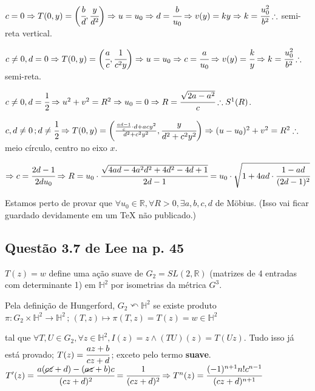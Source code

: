 \documentclass[10pt,a4paper]{article}
\begin{document}
		$c = 0 \Rightarrow T(0,y) = \bigg( \cfrac{b}{d}, \cfrac{y}{d^2} \bigg) \Rightarrow u = u_0 \Rightarrow d = \cfrac{b}{u_0} \Rightarrow v(y) = ky \Rightarrow k = \cfrac{u_0^2}{b^2} \therefore$ semi-reta vertical.

		$c \ne 0, d = 0 \Rightarrow T(0,y) = \bigg( \cfrac{a}{c}, \cfrac{1}{c^2 y} \bigg) \Rightarrow u = u_0 \Rightarrow c = \cfrac{a}{u_0} \Rightarrow v(y) = \cfrac{k}{y} \Rightarrow k = \cfrac{u_0^2}{b^2} \therefore$ semi-reta.

		$c \ne 0, d = \cfrac{1}{2} \Rightarrow u^2 + v^2 = R^2 \Rightarrow u_0 = 0 \Rightarrow R = \cfrac{\sqrt{2a - a^2}}{c} \therefore S^1(R)$.

		$c, d \ne 0\,; d \ne \cfrac{1}{2} \Rightarrow T(0,y) = \bigg( \frac{\frac{ad - 1}{c} \cdot d + acy^2}{d^2 + c^2 y^2}, \cfrac{y}{d^2 + c^2 y^2} \bigg) \Rightarrow (u - u_0)^2 + v^2 = R^2 \therefore$ meio c\'irculo, centro no eixo $x$.

		$\Rightarrow c = \cfrac{2d - 1}{2d u_0} \Rightarrow R = u_0 \cdot \cfrac{\sqrt{4ad - 4a^2 d^2 + 4d^2 - 4d + 1}}{2d - 1} = u_0 \cdot \sqrt{1 + 4ad \cdot \cfrac{1 - ad}{(2d - 1)^2}} $

		\vspace{3mm}

		Estamos perto de provar que $\forall u_0 \in \mathbb{R}, \forall R > 0, \exists a,b,c,d $ de M\"obius. (Isso vai ficar guardado devidamente em um TeX n\~ao publicado.)

		\subsection{Quest\~ao 3.7 de Lee na p. 45}
		\begin{flushright}
		\end{flushright}

		$T(z) = w$ define uma a\c{c}\~ao suave de $G_2 = SL(2, \mathbb{R})$ (matrizes de 4 entradas com determinante 1) em $\mathbb{H}^2$ por isometrias da m\'etrica $G^3$.

		Pela defini\c{c}\~ao de Hungerford, $G_2 \curvearrowleft \mathbb{H}^2$ se existe produto $\pi : G_2 \times \mathbb{H}^2 \rightarrow \mathbb{H}^2 \,;\, (T, z) \mapsto \pi(T,z) = T(z) = w \in \mathbb{H}^2$

		tal que $\forall T, U \in G_2, \forall z \in \mathbb{H}^2, I(z) = z \wedge (TU)(z) = T(Uz)$. Tudo isso j\'a est\'a provado; $T(z) = \cfrac{az + b}{cz + d}\,$; exceto pelo termo \textbf{suave}. $T'(z) = \cfrac{a(\cancel{cz} + d) - (\cancel{az} + b)c}{(cz + d)^2} = \cfrac{1}{{(cz + d)^2}} \Rightarrow T^n(z) = \cfrac{(-1)^{n + 1} n! c^{n - 1}}{(cz + d)^{n + 1}}$
\end{document}
